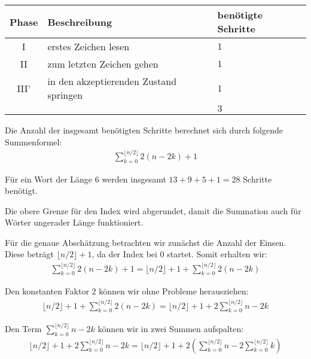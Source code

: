 \begin{enumerate}
\begin{enumerate}
        \begin{tabular}{cll}
          Phase & Beschreibung & benötigte Schritte\\
          \midrule
          I & erstes Zeichen lesen & $1$\\
          II & zum letzten Zeichen gehen & $1$\\
          III' & in den akzeptierenden Zustand springen & $1$\\
          \midrule
          & & $3$\\
          \bottomrule
        \end{tabular}

        Die Anzahl der insgesamt benötigten Schritte berechnet sich durch
        folgende Summenformel:
        \begin{align*}
          \sum\limits_{k=0}^{\lfloor n/2 \rfloor} 2(n - 2k) + 1
        \end{align*}

        Für ein Wort der Länge $6$ werden insgesamt $13 + 9 + 5 + 1 = 28$
        Schritte benötigt.

        Die obere Grenze für den Index wird abgerundet, damit die Summation auch
        für Wörter ungerader Länge funktioniert.

        Für die genaue Abschätzung betrachten wir zunächst die Anzahl der
        Einsen. Diese beträgt $\lfloor n/2 \rfloor + 1$, da der Index bei $0$
        startet. Somit erhalten wir:
        \begin{align*}
          \sum\limits_{k=0}^{\lfloor n/2 \rfloor} 2(n - 2k) + 1
          = \lfloor n/2 \rfloor + 1 + \sum\limits_{k=0}^{\lfloor n/2 \rfloor} 2(n - 2k)
        \end{align*}

        Den konstanten Faktor $2$ können wir ohne Probleme herausziehen:
        \begin{align*}
          \lfloor n/2 \rfloor + 1 + \sum\limits_{k=0}^{\lfloor n/2 \rfloor} 2(n - 2k)
          = \lfloor n/2 \rfloor + 1 + 2 \sum\limits_{k=0}^{\lfloor n/2 \rfloor} n - 2k
        \end{align*}

        Den Term $\sum\limits_{k=0}^{\lfloor n/2 \rfloor} n - 2k$ können wir in
        zwei Summen aufspalten:
        \begin{align*}
          \lfloor n/2 \rfloor + 1 + 2 \sum\limits_{k=0}^{\lfloor n/2 \rfloor} n - 2k
          = \lfloor n/2 \rfloor + 1 + 2
            \left(
              \sum\limits_{k=0}^{\lfloor n/2 \rfloor} n
              - 2 \sum\limits_{k=0}^{\lfloor n/2 \rfloor} k
            \right)
        \end{align*}


\end{enumerate}
\end{enumerate}

